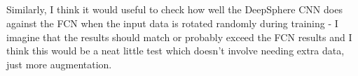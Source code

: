 \documentclass[12pt,a4paper]{article}
\newcommand{\nati}[1]{{\color[rgb]{.1,.6,.1}{NP: #1}}}
\newcommand{\mdeff}[1]{{\color[rgb]{.1,.6,.1}{MD: #1}}}
\newcommand{\TK}[1]{{\color{red}{TK: #1}}}
\newcommand{\todo}[1]{{\color[rgb]{.6,.1,.6}{TODO: #1}}}
\newcommand{\1}{\b{1}}              %
\newcommand{\0}{\b{0}}              %
\begin{document}



\subsection{}

\begin{mdframed}[style=comment]
Similarly, I think it would useful to check how well the DeepSphere CNN does against the FCN when the input data is rotated randomly during training - I imagine that the results should match or probably exceed the FCN results and I think this would be a neat little test which doesn't involve needing extra data, just more augmentation.
\end{mdframed}
\end{document}
